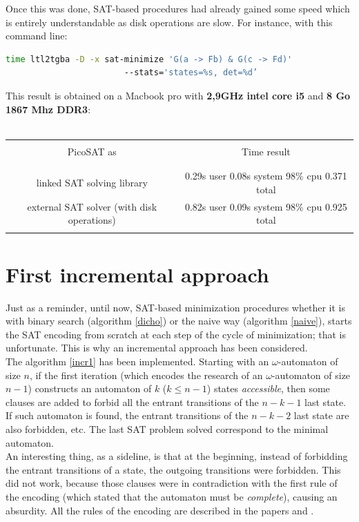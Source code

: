 Once this was done, SAT-based procedures had already gained some speed which is entirely understandable as
disk operations are slow. For instance, with this command
line:
\begin{lstlisting}[language=bash,caption={bash command-line to test a formula minimization using ltl2tgba}]
  time ltl2tgba -D -x sat-minimize 'G(a -> Fb) & G(c -> Fd)'
                        --stats='states=%s, det=%d’
\end{lstlisting}
This result is obtained on a Macbook pro with \textbf{2,9GHz intel core i5} and
\textbf{8 Go 1867 Mhz DDR3}:\\\\
\begin{tabular}{|c|c|}
 \hline
 &\\
 PicoSAT as & Time result\\
 &\\
 \hline
 &\\
 linked SAT solving library&0.29s user 0.08s system 98\% cpu 0.371 total\\
 external SAT solver (with disk operations)&0.82s user 0.09s system 98\% cpu 0.925 total\\
 &\\
 \hline
\end{tabular}

\section{First incremental approach}
\label{approach1}
Just as a reminder, until now, SAT-based minimization procedures whether it is with binary search
(algorithm \ref{dicho}) or the naive way (algorithm \ref{naive}), starts the SAT encoding from scratch
at each step of the cycle of minimization; that is unfortunate. This is why an incremental approach
has been considered.\\

\noindent  The algorithm \ref{incr1} has been implemented. Starting with an $\omega$-automaton of size
$n$, if the first iteration (which encodes the research of an $\omega$-automaton of size $n-1$) constructs
an automaton of $k$ ($k \leq n-1$) states \textit{accessible}, then some clauses are added to forbid all the
entrant transitions of the $n-k-1$ last state. If such automaton is found, the entrant transitions of the
$n-k-2$ last state are also forbidden, etc. The last SAT problem solved correspond to the minimal
automaton.\\

\noindent An interesting thing, as a sideline, is that at the beginning, instead of forbidding the entrant
transitions of a state, the outgoing transitions were forbidden. This did not work, because those
clauses were in contradiction with the first rule of the encoding (which stated that the automaton must be
\textit{complete}), causing an absurdity. All the rules of the encoding are described in the papers
\cite{14} and \cite{15}.\\

